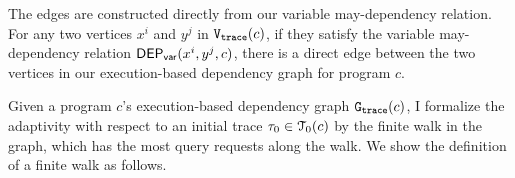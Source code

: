 {
The edges are constructed directly from our variable may-dependency relation. 
For any two vertices $x^{i}$ and $y^{j}$ in $\mathtt{{V_{trace}}}(c)$, if they satisfy the variable may-dependency relation $\mathsf{DEP_{var}}(x^i, y^j, c)$, there is a direct edge between the two vertices in our execution-based dependency graph for program $c$.
} 

Given 
a program $c$'s execution-based dependency graph 
$\mathtt{{G_{trace}}}({c})$,
I formalize the adaptivity 
with respect to an initial trace $\mathtt{\tau}_0 \in \mathcal{T}_0(c)$ by the finite walk in the graph, which has the most query requests along the walk.
We show the definition of a finite walk as follows.
%

